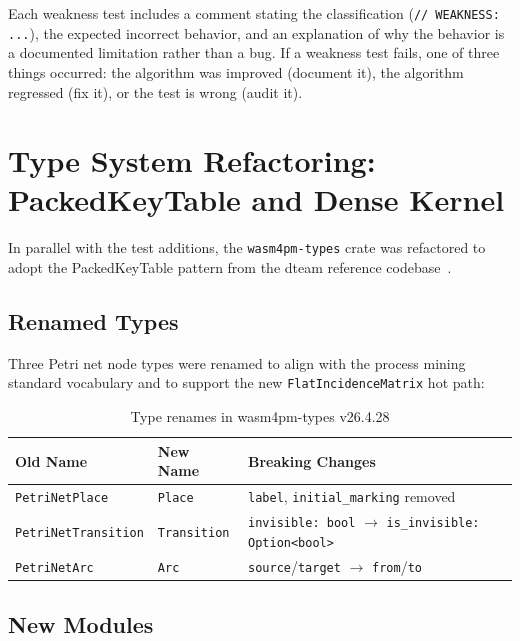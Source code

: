 \documentclass[12pt,a4paper]{article}
\begin{document}
Each weakness test includes a comment stating the classification
(\texttt{// WEAKNESS: ...}), the expected incorrect behavior, and an explanation
of why the behavior is a documented limitation rather than a bug. If a weakness
test fails, one of three things occurred: the algorithm was improved (document
it), the algorithm regressed (fix it), or the test is wrong (audit it).

\section{Type System Refactoring: PackedKeyTable and Dense Kernel}
\label{sec:types}

In parallel with the test additions, the \texttt{wasm4pm-types} crate was
refactored to adopt the PackedKeyTable pattern from the dteam reference
codebase~\cite{dteam2025}.

\subsection{Renamed Types}

Three Petri net node types were renamed to align with the process mining standard
vocabulary and to support the new \texttt{FlatIncidenceMatrix} hot path:

\begin{table}[H]
  \centering
  \caption{Type renames in wasm4pm-types v26.4.28}
  \label{tab:types}
  \begin{tabular}{lll}
    \toprule
    \textbf{Old Name} & \textbf{New Name} & \textbf{Breaking Changes} \\
    \midrule
    \texttt{PetriNetPlace} & \texttt{Place} & \texttt{label}, \texttt{initial\_marking} removed \\
    \texttt{PetriNetTransition} & \texttt{Transition} & \texttt{invisible: bool} $\to$ \texttt{is\_invisible: Option\textless bool\textgreater} \\
    \texttt{PetriNetArc} & \texttt{Arc} & \texttt{source}/\texttt{target} $\to$ \texttt{from}/\texttt{to} \\
    \bottomrule
  \end{tabular}
\end{table}

\subsection{New Modules}
\end{document}
